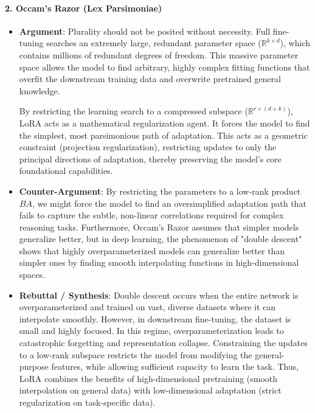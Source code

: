 \paragraph{2. Occam's Razor (Lex Parsimoniae)}
\begin{itemize}
  \item \textbf{Argument}: Plurality should not be posited without necessity. Full fine-tuning searches an extremely large, redundant parameter space ($\mathbb{R}^{k \times d}$), which contains millions of redundant degrees of freedom. This massive parameter space allows the model to find arbitrary, highly complex fitting functions that overfit the downstream training data and overwrite pretrained general knowledge.
  
  By restricting the learning search to a compressed subspace ($\mathbb{R}^{r \times (d+k)}$), LoRA acts as a mathematical regularization agent. It forces the model to find the simplest, most parsimonious path of adaptation. This acts as a geometric constraint (projection regularization), restricting updates to only the principal directions of adaptation, thereby preserving the model's core foundational capabilities.
  
  \item \textbf{Counter-Argument}: By restricting the parameters to a low-rank product $BA$, we might force the model to find an oversimplified adaptation path that fails to capture the subtle, non-linear correlations required for complex reasoning tasks. Furthermore, Occam's Razor assumes that simpler models generalize better, but in deep learning, the phenomenon of "double descent" shows that highly overparameterized models can generalize better than simpler ones by finding smooth interpolating functions in high-dimensional spaces.
  
  \item \textbf{Rebuttal / Synthesis}: Double descent occurs when the entire network is overparameterized and trained on vast, diverse datasets where it can interpolate smoothly. However, in downstream fine-tuning, the dataset is small and highly focused. In this regime, overparameterization leads to catastrophic forgetting and representation collapse. Constraining the updates to a low-rank subspace restricts the model from modifying the general-purpose features, while allowing sufficient capacity to learn the task. Thus, LoRA combines the benefits of high-dimensional pretraining (smooth interpolation on general data) with low-dimensional adaptation (strict regularization on task-specific data).
\end{itemize}

